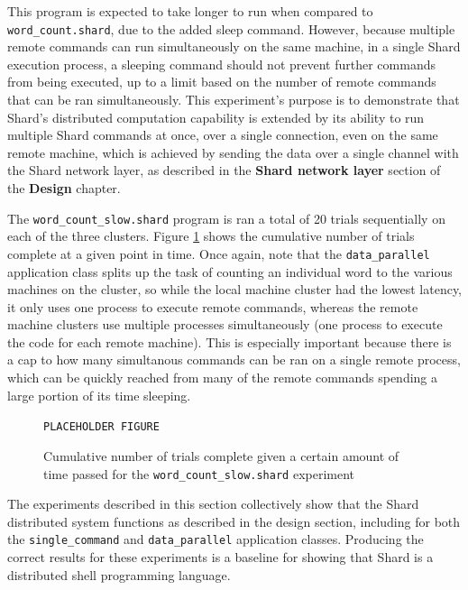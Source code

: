 \documentclass[twoside]{report}
\newcommand{\todoi}[1]{\todo[inline, color=blue!20]{TODO: {#1}}}
\begin{document}
This program is expected to take longer to run when compared to \texttt{word\_count.shard}, due to the added sleep command.
However, because multiple remote commands can run simultaneously on the same machine, in a single Shard execution process, a sleeping command should not prevent further commands from being executed, up to a limit based on the number of remote commands that can be ran simultaneously.
This experiment's purpose is to demonstrate that Shard's distributed computation capability is extended by its ability to run multiple Shard commands at once, over a single connection, even on the same remote machine, which is achieved by sending the data over a single channel with the Shard network layer, as described in the \textbf{Shard network layer} section of the \textbf{Design} chapter.

The \texttt{word\_count\_slow.shard} program is ran a total of 20 trials sequentially on each of the three clusters. Figure \ref{fig:wordcountslow} shows the cumulative number of trials complete at a given point in time. Once again, note that the \texttt{data\_parallel} application class splits up the task of counting an individual word to the various machines on the cluster, so while the local machine cluster had the lowest latency, it only uses one process to execute remote commands, whereas the remote machine clusters use multiple processes simultaneously (one process to execute the code for each remote machine). This is especially important because there is a cap to how many simultanous commands can be ran on a single remote process, which can be quickly reached from many of the remote commands spending a large portion of its time sleeping.

\begin{figure}[h]
  \begin{center}
    \vspace{2cm}
    \texttt{PLACEHOLDER FIGURE}
    \vspace{2cm}
    \caption{Cumulative number of trials complete given a certain amount of time passed for the \texttt{word\_count\_slow.shard} experiment}
    \label{fig:wordcountslow}
  \end{center}
\end{figure}

\todoi{Some analysis on the actual results}

The experiments described in this section collectively show that the Shard distributed system functions as described in the design section, including for both the \texttt{single\_command} and \texttt{data\_parallel} application classes.
Producing the correct results for these experiments is a baseline for showing that Shard is a distributed shell programming language.
\end{document}
